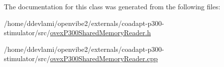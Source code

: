 The documentation for this class was generated from the following files:\begin{DoxyCompactItemize}
\item 
/home/ddevlami/openvibe2/externals/coadapt-\/p300-\/stimulator/src/\hyperlink{ovexP300SharedMemoryReader_8h}{ovexP300SharedMemoryReader.h}\item 
/home/ddevlami/openvibe2/externals/coadapt-\/p300-\/stimulator/src/\hyperlink{ovexP300SharedMemoryReader_8cpp}{ovexP300SharedMemoryReader.cpp}\end{DoxyCompactItemize}
